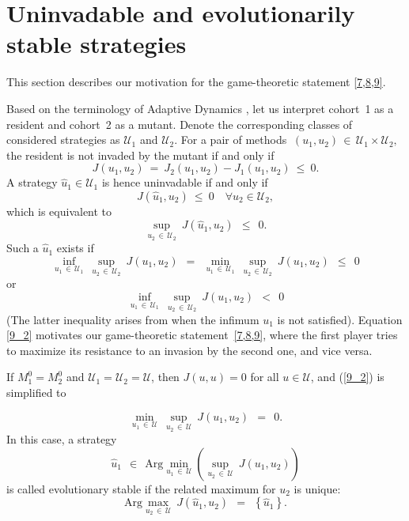 \documentclass[11pt]{amsart}
\begin{document}
\section{Uninvadable and evolutionarily stable strategies}

This section describes our motivation for the 
game-theoretic %
statement
{\rm \cref{7,8,9}}.

Based on the terminology of Adaptive Dynamics \cite{DercoleRinaldi2008}, let
us interpret cohort~{\rm 1} as a resident and cohort~{\rm 2} as a mutant.
Denote the corresponding classes of considered strategies as $ \mathcal{U}_1 $
and $ \mathcal{U}_2 $. For a pair of methods
$ \: (u_1, u_2) \, \in \, \mathcal{U}_1 \times \mathcal{U}_2, \: $
the resident is not invaded by the mutant if and only if
$$
J(u_1, u_2) \: = \: J_2(u_1, u_2) - J_1(u_1, u_2) \: \leqslant \: 0.
$$
A strategy 
$ \hat{u}_1 \in \mathcal{U}_1 $
is hence uninvadable if and only if
$$
J \left( \hat{u}_1, u_2 \right) \: \leqslant \: 0 \quad \forall u_2 \in
  \mathcal{U}_2,
$$
which is equivalent to
$$
\sup_{u_2 \, \in \, \mathcal{U}_2} \: J \left( \hat{u}_1, u_2 \right) \:\:
  \leqslant \:\: 0.
$$
Such a $ \hat{u}_1 $ exists if
\begin{equation}
\inf_{u_1 \, \in \, \mathcal{U}_1} \: \sup_{u_2 \, \in \, \mathcal{U}_2} \:
  J(u_1, u_2) \:\: = \:\:
\min_{u_1 \, \in \, \mathcal{U}_1} \: \sup_{u_2 \, \in \, \mathcal{U}_2} \:
  J(u_1, u_2) \:\: \leqslant \:\: 0  \label{9_2}
\end{equation}
or
\begin{equation}
\inf_{u_1 \, \in \, \mathcal{U}_1} \: \sup_{u_2 \, \in \, \mathcal{U}_2} \:
  J(u_1, u_2) \:\: < \:\: 0  \label{9_4}
\end{equation}
(The latter inequality arises from when the infimum $u_1$ is not satisfied).
Equation \cref{9_2} motivates our game-theoretic statement~{\rm \cref{7,8,9},}
where the first player tries to maximize its resistance to an invasion by the
second one{\rm ,} and vice versa.

If $ M_1^0 = M_2^0 $ and $ \mathcal{U}_1 = \mathcal{U}_2 = \mathcal{U} ${\rm ,}
then $ J(u, u) = 0 $ for all $ u \in \mathcal{U} ${\rm ,} and {\rm (\ref{9_2})}
is simplified to

\begin{equation}
\min_{u_1 \, \in \, \mathcal{U}} \: \sup_{u_2 \, \in \, \mathcal{U}} \:
  J(u_1, u_2) \:\: = \:\: 0.  \label{9_3}
\end{equation}
In this case{\rm ,} a strategy
$$
\hat{u}_1 \:\: \in \:\: \mathrm{Arg} \min_{u_1 \, \in \, \mathcal{U}}
  \left( \sup_{u_2 \, \in \, \mathcal{U}} \: J(u_1, u_2) \right)
$$
is called evolutionary stable if the related maximum for $ u_2 $ is
unique{\rm :}
$$
\mathrm{Arg} \max_{u_2 \, \in \, \mathcal{U}} \: J \left( \hat{u}_1, u_2
  \right) \:\: = \:\: \left\{ \hat{u}_1 \right\}.
$$
\end{document}
